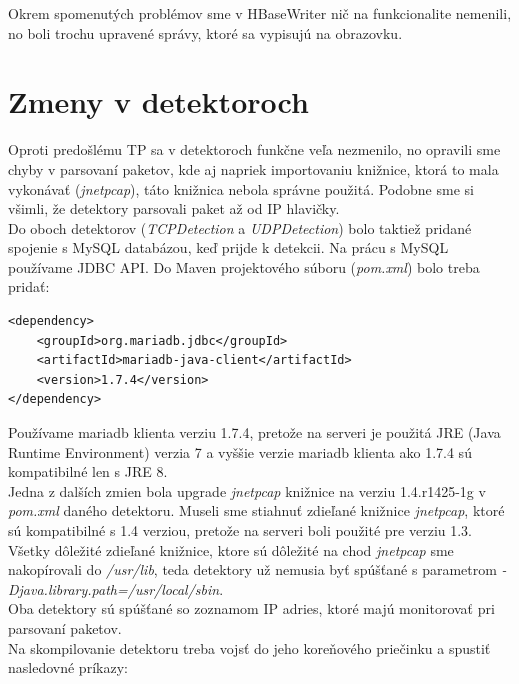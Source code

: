 \documentclass[a4paper,12pt]{article}
\begin{document}
 
 
\noindent Okrem spomenutých problémov sme v HBaseWriter nič na funkcionalite nemenili, no boli trochu upravené správy, ktoré sa vypisujú na obrazovku. \\
 
\section{Zmeny v detektoroch}
Oproti predošlému TP sa v detektoroch funkčne veľa nezmenilo, no opravili sme chyby v parsovaní paketov, kde aj napriek importovaniu knižnice, ktorá to mala vykonávať (\textit{jnetpcap}), táto knižnica nebola správne použitá. Podobne sme si všimli, že detektory parsovali paket až od IP hlavičky. \\

Do oboch detektorov (\textit{TCPDetection} a \textit{UDPDetection}) bolo taktiež pridané spojenie s MySQL databázou, keď prijde k detekcii. Na prácu s MySQL používame JDBC API. Do Maven projektového súboru (\textit{pom.xml}) bolo treba pridať:

\begin{lstlisting}
<dependency>
	<groupId>org.mariadb.jdbc</groupId>
	<artifactId>mariadb-java-client</artifactId>
	<version>1.7.4</version>
</dependency>
\end{lstlisting}

Používame mariadb klienta verziu 1.7.4, pretože na serveri je použitá JRE (Java Runtime Environment) verzia 7 a vyššie verzie mariadb klienta ako 1.7.4 sú kompatibilné len s JRE 8. \\

Jedna z dalších zmien bola upgrade \textit{jnetpcap} knižnice na verziu 1.4.r1425-1g v \textit{pom.xml} daného detektoru. Museli sme stiahnuť zdieľané knižnice \textit{jnetpcap}, ktoré sú kompatibilné s 1.4 verziou, pretože na serveri boli použité pre verziu 1.3. Všetky dôležité zdieľané knižnice, ktore sú dôležité na chod \textit{jnetpcap} sme nakopírovali do \textit{/usr/lib}, teda detektory už nemusia byť spúšťané s parametrom \textit{-Djava.library.path=/usr/local/sbin}. \\

Oba detektory sú spúšťané so zoznamom IP adries, ktoré majú monitorovať pri parsovaní paketov. \\

Na skompilovanie detektoru treba vojsť do jeho koreňového priečinku a spustiť nasledovné príkazy: \\
\end{document}
